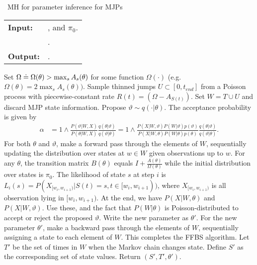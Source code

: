 \begin{algorithm}[H]
   \caption{\Naive\  MH for parameter inference for MJPs }
   \label{alg:MH_naive}
  \begin{tabular}{l l}
   \textbf{Input:  } & \text{Observations $X$}, 
                       \text{the MJP path $S(t) = (S, T)$, the  parameters $\theta$ }and $\pi_0$.\\ 
                     & \text{A  Metropolis-Hasting proposal $q(\cdot | \theta)$}.\\
   \textbf{Output:  }& \text{A new MJP trajectory $S'(t) = (S', T')$, 
                            new MJP parameters $\theta'$}.\\
   \hline
   \end{tabular}
   \begin{algorithmic}[1]
     \State Set $\Omega \doteq \Omega(\theta) > \max_s{A_s(\theta)}$ for
     some function $\Omega(\cdot)$ (e.g.\ $\Omega(\theta) = 
      2\max_s A_s(\theta))$.
      \State Sample thinned jumps $U\subset[0, t_{end}]$ from a 
      Poisson process with piecewise-constant rate 
      $R(t) = (\Omega - A_{S(t)})$. 
    Set $W = T \cup U$ and discard MJP state information.
      \State Propose $\vartheta \sim q(\cdot| \theta)$.
          The acceptance probability is given by 
          \vspace{-.05in}
          \begin{align*}
          \alpha &=  1 \wedge \frac{P(\vartheta|W, X)}{P(\theta|W, X)} \frac{q(\theta|\vartheta)}{q(\vartheta|\theta)}
          =  1 \wedge \frac{P(X| W,\vartheta) P(W | \vartheta)p(\vartheta)}
            {P(X|W, \theta)P(W | \theta)p(\theta)} \frac{q(\theta|\vartheta)}{q(\vartheta|\theta)}.
          \end{align*}
          \vspace{-.1in}
    \State For both $\theta$ and $\vartheta$, make a forward pass through the 
    elements of $W$, sequentially updating the distribution over states at 
    $w \in W$ given observations up to $w$. 
    For any $\theta$, the transition matrix 
    $B(\theta)$ equals $I + \frac{A(\theta)}{\Omega(\theta)}$ while the initial distribution
      over states is $\pi_0$. The likelihood of state $s$ at step $i$ is 
      $ L_i(s) = P(X_{[w_i, w_{i + 1})} | S(t) = s , t \in [w_i, w_{i + 1})) 
      $, where $X_{[w_i,w_{i+1})}$ is all observation lying in 
      $[w_i,w_{i+1})$. %
    At the end, we have 
    $P(X|W,\theta)$ and $P(X|W,\vartheta)$. Use these, and the fact that 
    $P(W|\theta)$ is Poisson-distributed to accept or reject the
    proposed $\vartheta$. Write the new parameter as $\theta'$.
    \State For the new parameter $\theta'$, make a backward pass through 
    the elements of
    $W$, sequentially assigning a state to each element of $W$. This
    completes the FFBS algorithm.
    \State Let $T'$ be the set of times in $W$ when the Markov chain changes state. Define $S'$ as the corresponding set of state values. Return $(S', T', \theta')$.
\end{algorithmic}
\end{algorithm}
\vspace{-.32in}

